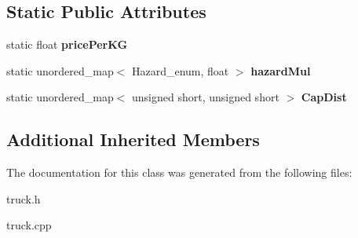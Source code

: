 \subsection*{Static Public Attributes}
\begin{DoxyCompactItemize}
\item 
\mbox{\label{class_hazardous_mat_a9f71519edca3e72082720686781c34dc}} 
static float {\bfseries price\+Per\+KG}
\item 
\mbox{\label{class_hazardous_mat_a0d695364bed729ddeca5851314281ad2}} 
static unordered\+\_\+map$<$ Hazard\+\_\+enum, float $>$ {\bfseries hazard\+Mul}
\item 
\mbox{\label{class_hazardous_mat_ab67d8b349d8035e402482116d64bf41c}} 
static unordered\+\_\+map$<$ unsigned short, unsigned short $>$ {\bfseries Cap\+Dist}
\end{DoxyCompactItemize}
\subsection*{Additional Inherited Members}


The documentation for this class was generated from the following files\+:\begin{DoxyCompactItemize}
\item 
truck.\+h\item 
truck.\+cpp\end{DoxyCompactItemize}
